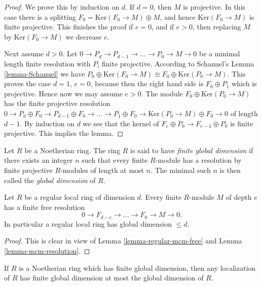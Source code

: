 \begin{proof}
We prove this by induction on $d$. If $d = 0$, then
$M$ is projective. In this case there is a splitting
$F_0 = \text{Ker}(F_0 \to M) \oplus M$, and hence
$\text{Ker}(F_0 \to M)$ is finite projective. This finishes
the proof if $e = 0$, and if $e > 0$, then replacing
$M$ by $\text{Ker}(F_0 \to M)$ we decrease $e$.

\medskip\noindent
Next assume $d > 0$.
Let $0 \to P_d \to P_{d-1} \to \ldots \to P_0 \to M \to 0$
be a minimal length finite resolution with $P_i$ finite projective. 
According to Schanuel's Lemma \ref{lemma-Schanuel} we have
$P_0 \oplus \text{Ker}(F_0 \to M) \cong F_0 \oplus \text{Ker}(P_0 \to M)$.
This proves the case $d = 1$, $e = 0$, because then the right
hand side is $F_0 \oplus P_1$ which is projective. Hence now we may
assume $e > 0$. The module
$F_0 \oplus \text{Ker}(P_0 \to M)$ has the finite projective resolution
$0 \to P_d \oplus F_0 \to P_{d-1} \oplus F_0 \to \ldots \to P_1 \oplus F_0
\to \text{Ker}(P_0 \to M) \oplus F_0 \to 0$ of length $d - 1$.
By induction on $d$ we see that the kernel of
$F_{e} \oplus P_0 \to F_{e-1} \oplus P_0$ is finite projective.
This implies the lemma.
\end{proof}

\begin{definition}
\label{definition-finite-gl-dim}
Let $R$ be a Noetherian ring. The ring
$R$ is said to have {\it finite global dimension}
if there exists an integer $n$ such that
every finite $R$-module has a resolution by finite
projective $R$-modules of length at most $n$.
The minimal such $n$ is then called the {\it global dimension}
of $R$.
\end{definition}

\begin{proposition}
\label{proposition-regular-finite-gl-dim}
Let $R$ be a regular local ring of dimension $d$.
Every finite $R$-module $M$ of depth $e$ has a finite free
resolution
$$
0 \to F_{d-e} \to \ldots \to F_0 \to M \to 0.
$$
In particular a regular local ring has global dimension $\leq d$.
\end{proposition}

\begin{proof}
This is clear in view of Lemma \ref{lemma-regular-mcm-free}
and Lemma \ref{lemma-mcm-resolution}.
\end{proof}

\begin{lemma}
\label{lemma-localize-finite-gl-dim}
If $R$ is a Noetherian ring which has finite global dimension,
then any localization of $R$ has finite global dimension
at most the global dimension of $R$.
\end{lemma}

